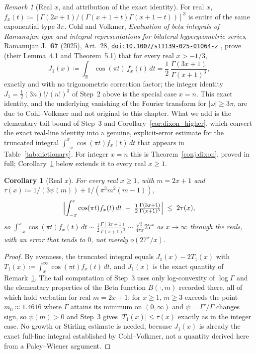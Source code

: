 \documentclass[11pt,a4paper]{article}
\theoremstyle{plain}
\newtheorem{corollary}[theorem]{Corollary}
\theoremstyle{definition}
\theoremstyle{remark}
\newtheorem{remark}[theorem]{Remark}
\numberwithin{equation}{section}
\providecommand{\doi}[1]{\href{https://doi.org/#1}{\texttt{doi:#1}}}
\begin{document}
\begin{remark}[Real $x$, and attribution of the exact identity]
\label{rem:dixon_real}
For real $x$, $f_x(t)\coloneqq[\Gamma(2x+1)/(\Gamma(x+1+t)\Gamma(x+1-t))]^3$ is entire of the same exponential type $3\pi$. Cohl and Volkmer, \emph{Evaluation of beta integrals of Ramanujan type and integral representations for bilateral hypergeometric series}, Ramanujan J.\ \textbf{67} (2025), Art.\ 28, \doi{10.1007/s11139-025-01064-z} \cite{cohlvolkmer2025}, prove (their Lemma~4.1 and Theorem~5.1) that for every real $x>-1/3$,
\begin{equation}
J_1(x) \coloneqq \int_{\mathbb{R}}\cos(\pi t)\,f_x(t)\,dt = \frac12\,\frac{\Gamma(3x+1)}{\Gamma(x+1)^3},
\end{equation}
exactly and with no trigonometric correction factor; the integer identity $J_1=\frac12(3n)!/(n!)^3$ of Step~2 above is the special case $x=n$. This exact identity, and the underlying vanishing of the Fourier transform for $|\omega|\ge3\pi$, are due to Cohl--Volkmer and not original to this chapter. What we add is the elementary tail bound of Step~3 and Corollary~\ref{cor:dixon_higher}, which convert the exact real-line identity into a genuine, explicit-error estimate for the truncated integral $\int_{-x}^x\cos(\pi t)f_x(t)\,dt$ that appears in Table~\ref{tab:dictionary}. For integer $x=n$ this is Theorem~\ref{conj:dixon}, proved in full; Corollary~\ref{cor:dixon_real} below extends it to every real $x\ge1$.
\end{remark}

\begin{corollary}[Real $x$]
\label{cor:dixon_real}
For every real $x\ge1$, with $m=2x+1$ and $\tau(x)\coloneqq1/(3\psi(m))+1/(\pi^3m^2(m-1))$,
\begin{equation}
\Bigl|\int_{-x}^x\cos(\pi t)f_x(t)\,dt \;-\; \tfrac12\tfrac{\Gamma(3x+1)}{\Gamma(x+1)^3}\Bigr| \;\le\; 2\tau(x),
\end{equation}
so $\int_{-x}^x\cos(\pi t)f_x(t)\,dt \sim \frac12\frac{\Gamma(3x+1)}{\Gamma(x+1)^3} \sim \frac{\sqrt3}{4\pi x}27^x$ as $x\to\infty$ through the reals, with an error that tends to $0$, not merely $o(27^x/x)$.
\end{corollary}
\begin{proof}
By evenness, the truncated integral equals $J_1(x)-2T_1(x)$ with $T_1(x)\coloneqq\int_x^\infty\cos(\pi t)f_x(t)\,dt$, and $J_1(x)$ is the exact quantity of Remark~\ref{rem:dixon_real}. The tail computation of Step~3 uses only log-convexity of $\log\Gamma$ and the elementary properties of the Beta function $B(\cdot,m)$ recorded there, all of which hold verbatim for real $m=2x+1$; for $x\ge1$, $m\ge3$ exceeds the point $m_0\approx1.4616$ where $\Gamma$ attains its minimum on $(0,\infty)$ and $\psi=\Gamma'/\Gamma$ changes sign, so $\psi(m)>0$ and Step~3 gives $|T_1(x)|\le\tau(x)$ exactly as in the integer case. No growth or Stirling estimate is needed, because $J_1(x)$ is already the exact full-line integral established by Cohl--Volkmer, not a quantity derived here from a Paley--Wiener argument.
\end{proof}
\end{document}
